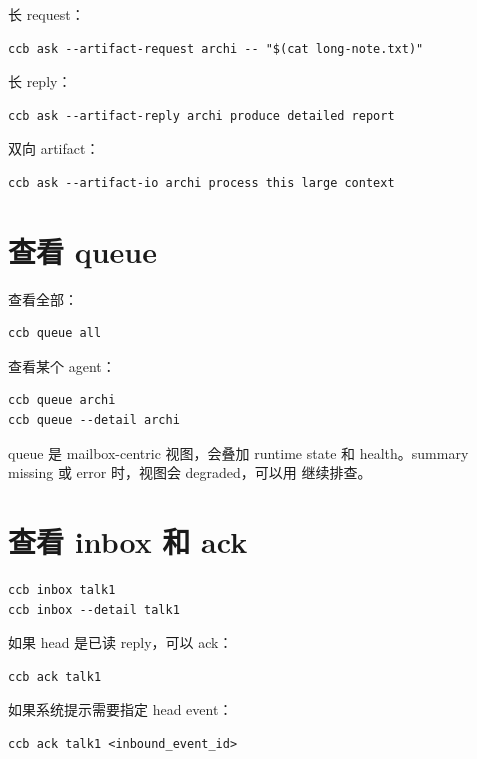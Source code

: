 长 request：

\begin{lstlisting}
ccb ask --artifact-request archi -- "$(cat long-note.txt)"
\end{lstlisting}

长 reply：

\begin{lstlisting}
ccb ask --artifact-reply archi produce detailed report
\end{lstlisting}

双向 artifact：

\begin{lstlisting}
ccb ask --artifact-io archi process this large context
\end{lstlisting}

\section{查看 queue}

查看全部：

\begin{lstlisting}
ccb queue all
\end{lstlisting}

查看某个 agent：

\begin{lstlisting}
ccb queue archi
ccb queue --detail archi
\end{lstlisting}

queue 是 mailbox-centric 视图，会叠加 runtime state 和 health。summary missing 或 error 时，视图会 degraded，可以用  继续排查。

\section{查看 inbox 和 ack}

\begin{lstlisting}
ccb inbox talk1
ccb inbox --detail talk1
\end{lstlisting}

如果 head 是已读 reply，可以 ack：

\begin{lstlisting}
ccb ack talk1
\end{lstlisting}

如果系统提示需要指定 head event：

\begin{lstlisting}
ccb ack talk1 <inbound_event_id>
\end{lstlisting}

